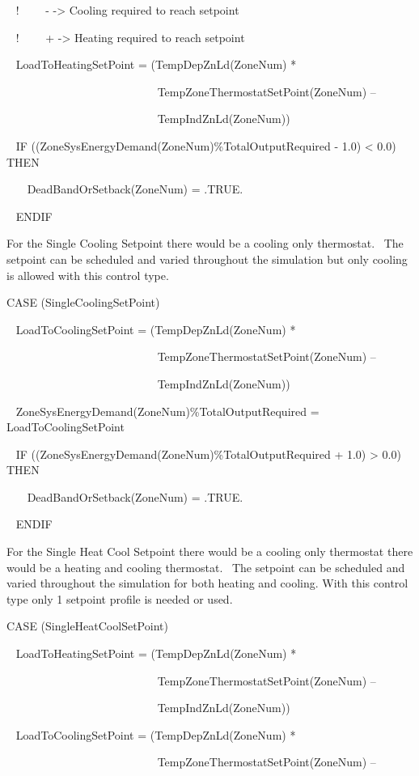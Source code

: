 ~ !~~~~ - -\textgreater{} Cooling required to reach setpoint

~ !~~~~ + -\textgreater{} Heating required to reach setpoint

~ LoadToHeatingSetPoint = (TempDepZnLd(ZoneNum) *

~~~~~~~~~~~~~~~~~~~~~~~~~~ TempZoneThermostatSetPoint(ZoneNum) --

~~~~~~~~~~~~~~~~~~~~~~~~~~ TempIndZnLd(ZoneNum))

~ IF ((ZoneSysEnergyDemand(ZoneNum)\%TotalOutputRequired - 1.0) \textless{} 0.0) THEN

~~ ~DeadBandOrSetback(ZoneNum) = .TRUE.

~ ENDIF

For the Single Cooling Setpoint there would be a cooling only thermostat.~ The setpoint can be scheduled and varied throughout the simulation but only cooling is allowed with this control type.

CASE (SingleCoolingSetPoint)

~ LoadToCoolingSetPoint = (TempDepZnLd(ZoneNum) *

~~~~~~~~~~~~~~~~~~~~~~ ~~~~TempZoneThermostatSetPoint(ZoneNum) --

~~~~~~~~~~~~~~~~~~~~~~~~~~ TempIndZnLd(ZoneNum))

~ ZoneSysEnergyDemand(ZoneNum)\%TotalOutputRequired = LoadToCoolingSetPoint

~ IF ((ZoneSysEnergyDemand(ZoneNum)\%TotalOutputRequired + 1.0) \textgreater{} 0.0) THEN

~~~ DeadBandOrSetback(ZoneNum) = .TRUE.

~ ENDIF

For the Single Heat Cool Setpoint there would be a cooling only thermostat there would be a heating and cooling thermostat.~ The setpoint can be scheduled and varied throughout the simulation for both heating and cooling. With this control type only 1 setpoint profile is needed or used.

CASE (SingleHeatCoolSetPoint)

~ LoadToHeatingSetPoint = (TempDepZnLd(ZoneNum) *

~~~~~~~~~~~~~~~~~~~~~~~~~ ~TempZoneThermostatSetPoint(ZoneNum) --

~~~~~~~~~~~~~~~~~~~~~~~~~~ TempIndZnLd(ZoneNum))

~ LoadToCoolingSetPoint = (TempDepZnLd(ZoneNum) *

~~~~~~~~~~~~~~~~~~~~~~~~~ ~TempZoneThermostatSetPoint(ZoneNum) --

